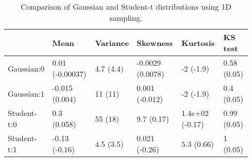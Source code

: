 \begin{table}
\caption{Comparison of Gaussian and Student-t distributions using 1D sampling.}
\label{tab:ch5_6_b}
\begin{tabular}{llllll}
\toprule
 & Mean & Variance & Skewness & Kurtosis & KS test \\
\midrule
Gaussian:0 & 0.01 (-0.00037) & 4.7 (4.4) & -0.0029 (0.0078) & -2 (-1.9) & 0.58 (0.05) \\
Gaussian:1 & -0.015 (0.004) & 11 (11) & 0.001 (-0.012) & -2 (-1.9) & 0.4 (0.05) \\
Student-t:0 & 0.3 (0.058) & 55 (18) & 9.7 (0.17) & 1.4e+02 (-0.17) & 0.99 (0.05) \\
Student-t:1 & -0.13 (-0.16) & 4.5 (3.5) & 0.021 (-0.26) & 5.3 (0.66) & 1 (0.05) \\
\bottomrule
\end{tabular}
\end{table}
